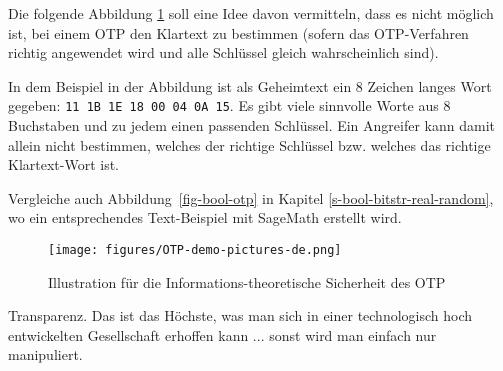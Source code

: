 \newpage
Die folgende Abbildung \ref{cm_Figure_OTP-demo-pictures} soll eine Idee davon vermitteln, dass es nicht möglich ist, bei einem OTP den Klartext zu bestimmen (sofern das OTP-Verfahren richtig angewendet wird und alle Schlüssel gleich wahrscheinlich sind).

In dem Beispiel in der Abbildung ist als Geheimtext ein 8 Zeichen langes Wort gegeben:
\texttt{11 1B 1E 18 00 04 0A 15}.
Es gibt viele sinnvolle Worte aus 8 Buchstaben und zu jedem einen passenden Schlüssel.
Ein Angreifer kann damit allein nicht bestimmen, welches der richtige Schlüssel bzw.
welches das richtige Klartext-Wort ist.

Vergleiche auch Abbildung~\ref{fig-bool-otp} in Kapitel \ref{s-bool-bitstr-real-random},
wo ein entsprechendes Text-Beispiel mit SageMath erstellt wird.
\begin{figure}[ht]
\begin{center}
\texttt{[image: figures/OTP-demo-pictures-de.png]}
\caption[Illustration für die Informations-theoretische Sicherheit des OTP]
        {Illustration für die Informations-theoretische Sicherheit des OTP\footnotemark}
\label{cm_Figure_OTP-demo-pictures}
\end{center}
\end{figure}





\newpage

\begin{ctsquote}
\glqq Transparenz. Das ist das Höchste, was man sich in einer technologisch hoch entwickelten Gesellschaft erhoffen kann ... sonst wird man einfach nur manipuliert.\grqq 
\caption[Daniel Suarez]{Daniel Suarez\footnotemark}
\end{ctsquote}
\addtocounter{footnote}{0}


